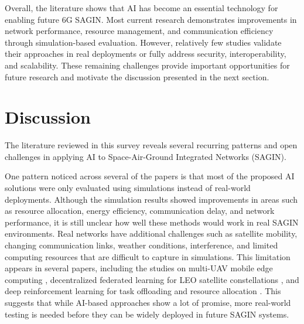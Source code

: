 \documentclass[letterpaper]{article} %
\begin{document}
Overall, the literature shows that AI has become an essential technology for enabling future 6G SAGIN. Most current research demonstrates improvements in network performance, resource management, and communication efficiency through simulation-based evaluation. However, relatively few studies validate their approaches in real deployments or fully address security, interoperability, and scalability. These remaining challenges provide important opportunities for future research and motivate the discussion presented in the next section.


\section{Discussion}

The literature reviewed in this survey reveals several recurring patterns and open challenges in applying AI to Space-Air-Ground Integrated Networks (SAGIN).

One pattern noticed across several of the papers is that most of the proposed AI solutions were only evaluated using simulations instead of real-world deployments. Although the simulation results showed improvements in areas such as resource allocation, energy efficiency, communication delay, and network performance, it is still unclear how well these methods would work in real SAGIN environments. Real networks have additional challenges such as satellite mobility, changing communication links, weather conditions, interference, and limited computing resources that are difficult to capture in simulations. This limitation appears in several papers, including the studies on multi-UAV mobile edge computing \citep{zhang2025energy}, decentralized federated learning for LEO satellite constellations \citep{yang2024dfedsat}, and deep reinforcement learning for task offloading and resource allocation \citep{huang2024joint}. This suggests that while AI-based approaches show a lot of promise, more real-world testing is needed before they can be widely deployed in future SAGIN systems.
\end{document}
